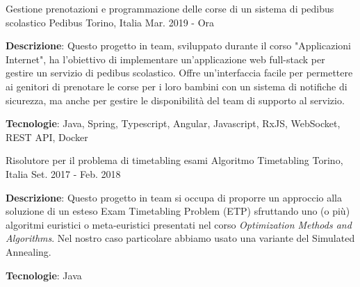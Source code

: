 {\begin{cventries}
  \cventry
  {Gestione prenotazioni e programmazione delle corse di un sistema di pedibus scolastico} %
  {Pedibus} %
  {Torino, Italia} %
  {Mar. 2019 - Ora} %
  {
   \begin{cvitems} %
     \item {\textbf{Descrizione}: Questo progetto in team, sviluppato durante il corso "Applicazioni Internet", ha l'obiettivo di implementare un'applicazione web full-stack per gestire un servizio di pedibus scolastico. Offre un'interfaccia facile per permettere ai genitori di prenotare le corse per i loro bambini con un sistema di notifiche di sicurezza, ma anche per gestire le disponibilità del team di supporto al servizio.}
      \item {\textbf{Tecnologie}: Java, Spring, Typescript, Angular, Javascript, RxJS, WebSocket, REST API, Docker}
   \end{cvitems}
  }{}

  \cventry
    {Risolutore per il problema di timetabling esami} %
    {Algoritmo Timetabling} %
    {Torino, Italia} %
    {Set. 2017 - Feb. 2018} %
    {
      \begin{cvitems} %
        \item {\textbf{Descrizione}: Questo progetto in team si occupa di proporre un approccio alla soluzione di un esteso Exam Timetabling Problem (ETP) sfruttando uno (o più) algoritmi euristici o meta-euristici presentati nel corso \textit{Optimization Methods and Algorithms}. Nel nostro caso particolare abbiamo usato una variante del Simulated Annealing.}
        \item {\textbf{Tecnologie}: Java}
      \end{cvitems}
    }{\href{https://github.com/pieromacaluso/ETPsolver_OMAMZ_group09}{\faGithub}}
\end{cventries}
}

